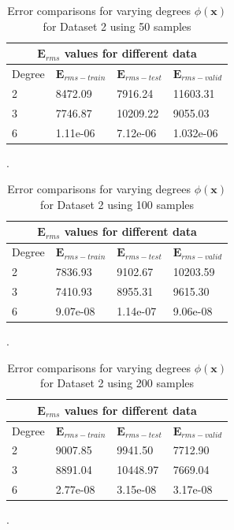 {
\begin{table}[!h]
\begin{tabular}{ |p{1.5cm}|p{3cm}|p{3cm}| p{3cm}|  }
\hline
\multicolumn{4}{|c|}{$\mathbf{E}_{rms}$ values for different data } \\
\hline
\rowcolor{lightgray} Degree & $\mathbf{E}_{rms-train}$ & $\mathbf{E}_{rms-test}$ & $\mathbf{E}_{rms-valid}$ \\
\hline
 2   &   8472.09  &  7916.24  &  11603.31   \\   
 \hline
 3   &   7746.87   &   10209.22  &   9055.03   \\
 \hline
 6   &   1.11e-06   &    7.12e-06     &     1.032e-06    \\
\hline
\end{tabular}
\caption{Error comparisons for varying degrees $\phi(\mathbf{x}) $ for Dataset 2 using 50 samples}.
\label{table:5}
\end{table}

\begin{table}[!h]
 \vspace*{\floatsep}
 \begin{tabular}{ |p{1.5cm}|p{3cm}|p{3cm}| p{3cm}|  }
\hline
\multicolumn{4}{|c|}{$\mathbf{E}_{rms}$ values for different data } \\
\hline
\rowcolor{lightgray} Degree & $\mathbf{E}_{rms-train}$ & $\mathbf{E}_{rms-test}$ & $\mathbf{E}_{rms-valid}$ \\
\hline
 2   &   7836.93  &  9102.67 &  10203.59  \\   
 \hline
 3   &   7410.93  &   8955.31 &   9615.30    \\
 \hline
 6   &   9.07e-08   &    1.14e-07     &     9.06e-08    \\
\hline
\end{tabular}
\caption{Error comparisons for varying degrees $\phi(\mathbf{x}) $ for Dataset 2 using 100 samples}.
\label{table:6}
\end{table}

\begin{table}[!h]
\vspace*{\floatsep}
 \begin{tabular}{ |p{1.5cm}|p{3cm}|p{3cm}| p{3cm}|  }
\hline
\multicolumn{4}{|c|}{$\mathbf{E}_{rms}$ values for different data } \\
\hline
\rowcolor{lightgray} Degree & $\mathbf{E}_{rms-train}$ & $\mathbf{E}_{rms-test}$ & $\mathbf{E}_{rms-valid}$ \\
\hline
 2   &   9007.85  &  9941.50 & 7712.90   \\   
 \hline
 3   &   8891.04   &   10448.97  &   7669.04    \\
 \hline
 6   &   2.77e-08   &    3.15e-08     &     3.17e-08   \\
\hline
\end{tabular}
\caption{Error comparisons for varying degrees $\phi(\mathbf{x}) $ for Dataset 2 using 200 samples}.
\label{table:7}
\end{table}

}

